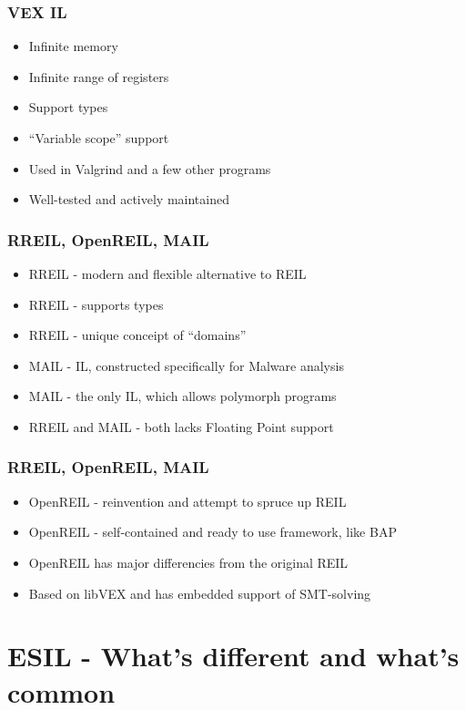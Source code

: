 \documentclass[10pt,pdf,utf8,english,compress,hyperref={unicode}]{beamer}
\begin{document}
\begin{frame}[fragile]
  \frametitle{VEX IL}
  \begin{itemize}
  \item Infinite memory
  \item Infinite range of registers
  \item Support types
  \item ``Variable scope'' support
  \item Used in Valgrind and a few other programs
  \item Well-tested and actively maintained
  \end{itemize}
\end{frame}

\begin{frame}[fragile]
  \frametitle{RREIL, OpenREIL, MAIL}
  \begin{itemize}
  \item RREIL  - modern and flexible alternative to REIL
  \item RREIL - supports types
  \item RREIL - unique conceipt of ``domains''
  \item MAIL - IL, constructed specifically for Malware analysis
  \item MAIL - the only IL, which allows polymorph programs
  \item RREIL and MAIL - both lacks Floating Point support
  \end{itemize}
\end{frame}

\begin{frame}[fragile]
  \frametitle{RREIL, OpenREIL, MAIL}
  \begin{itemize}
  \item OpenREIL  - reinvention and attempt to spruce up REIL
  \item OpenREIL - self-contained and ready to use framework, like BAP
  \item OpenREIL has major differencies from the original REIL
  \item Based on libVEX and has embedded support of SMT-solving
  \end{itemize}
\end{frame}


\section{ESIL - What's different and what's common}
\end{document}
